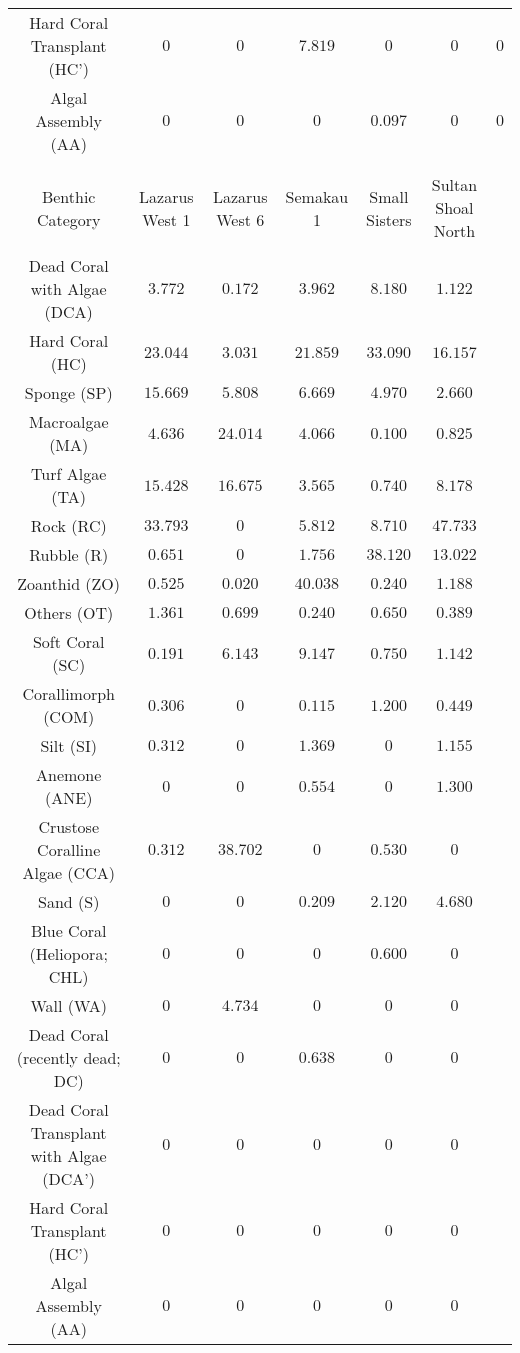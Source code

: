 \documentclass{article}
\begin{document}
\begin{table}[!htbp]
\begin{tabular}{@{\extracolsep{5pt}} ccccccc}
Hard Coral Transplant (HC') & $0$ & $0$ & $7.819$ & $0$ & $0$ & $0$ \\ 
Algal Assembly (AA) & $0$ & $0$ & $0$ & $0.097$ & $0$ & $0$ \\ 
\\[-1.8ex]\hline 
\hline \\[-1.8ex] 
Benthic Category & Lazarus West 1 & Lazarus West 6 & Semakau 1 & Small Sisters & Sultan Shoal North \\ 
\hline \\[-1.8ex] 
Dead Coral with Algae (DCA) & $3.772$ & $0.172$ & $3.962$ & $8.180$ & $1.122$ \\ 
Hard Coral (HC) & $23.044$ & $3.031$ & $21.859$ & $33.090$ & $16.157$ \\ 
Sponge (SP) & $15.669$ & $5.808$ & $6.669$ & $4.970$ & $2.660$ \\ 
Macroalgae (MA) & $4.636$ & $24.014$ & $4.066$ & $0.100$ & $0.825$ \\ 
Turf Algae (TA) & $15.428$ & $16.675$ & $3.565$ & $0.740$ & $8.178$ \\ 
Rock (RC) & $33.793$ & $0$ & $5.812$ & $8.710$ & $47.733$ \\ 
Rubble (R) & $0.651$ & $0$ & $1.756$ & $38.120$ & $13.022$ \\ 
Zoanthid (ZO) & $0.525$ & $0.020$ & $40.038$ & $0.240$ & $1.188$ \\ 
Others (OT)  & $1.361$ & $0.699$ & $0.240$ & $0.650$ & $0.389$ \\ 
Soft Coral (SC) & $0.191$ & $6.143$ & $9.147$ & $0.750$ & $1.142$ \\ 
Corallimorph (COM)  & $0.306$ & $0$ & $0.115$ & $1.200$ & $0.449$ \\ 
Silt (SI) & $0.312$ & $0$ & $1.369$ & $0$ & $1.155$ \\ 
Anemone (ANE) & $0$ & $0$ & $0.554$ & $0$ & $1.300$ \\ 
Crustose Coralline Algae (CCA) & $0.312$ & $38.702$ & $0$ & $0.530$ & $0$ \\ 
Sand (S) & $0$ & $0$ & $0.209$ & $2.120$ & $4.680$ \\ 
Blue Coral (Heliopora; CHL) & $0$ & $0$ & $0$ & $0.600$ & $0$ \\ 
Wall (WA) & $0$ & $4.734$ & $0$ & $0$ & $0$ \\ 
Dead Coral (recently dead; DC) & $0$ & $0$ & $0.638$ & $0$ & $0$ \\ 
Dead Coral Transplant with Algae (DCA') & $0$ & $0$ & $0$ & $0$ & $0$ \\ 
Hard Coral Transplant (HC') & $0$ & $0$ & $0$ & $0$ & $0$ \\ 
Algal Assembly (AA) & $0$ & $0$ & $0$ & $0$ & $0$ \\ 
\end{tabular} 
\end{table} 
\end{document}
